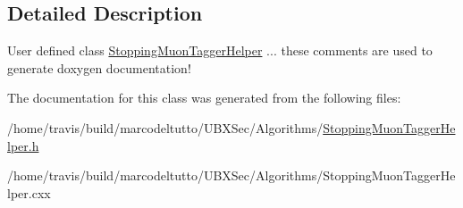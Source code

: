 \subsection{Detailed Description}
User defined class \hyperlink{classubana_1_1StoppingMuonTaggerHelper}{Stopping\-Muon\-Tagger\-Helper} ... these comments are used to generate doxygen documentation! 

The documentation for this class was generated from the following files\-:\begin{DoxyCompactItemize}
\item 
/home/travis/build/marcodeltutto/\-U\-B\-X\-Sec/\-Algorithms/\hyperlink{StoppingMuonTaggerHelper_8h}{Stopping\-Muon\-Tagger\-Helper.\-h}\item 
/home/travis/build/marcodeltutto/\-U\-B\-X\-Sec/\-Algorithms/Stopping\-Muon\-Tagger\-Helper.\-cxx\end{DoxyCompactItemize}
